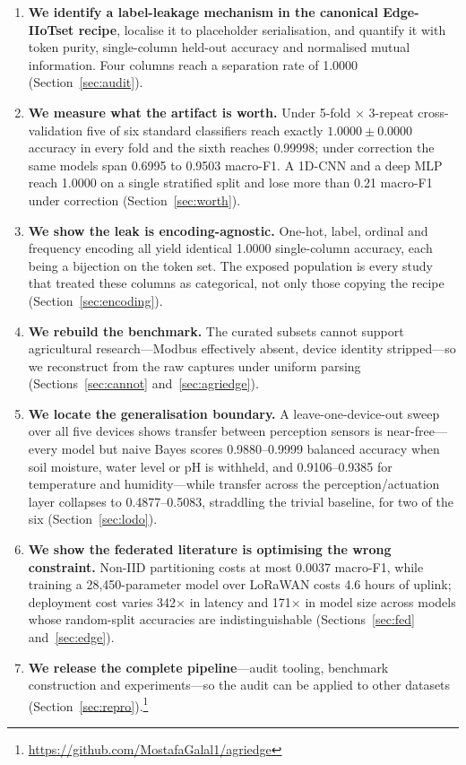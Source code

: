 \begin{enumerate}
\item \textbf{We identify a label-leakage mechanism in the canonical
Edge-IIoTset recipe}, localise it to placeholder serialisation, and quantify it
with token purity, single-column held-out accuracy and normalised mutual
information. Four columns reach a separation rate of 1.0000
(Section~\ref{sec:audit}).

\item \textbf{We measure what the artifact is worth.} Under 5-fold $\times$
3-repeat cross-validation five of six standard classifiers reach exactly
$1.0000 \pm 0.0000$ accuracy in every fold and the sixth reaches 0.99998; under
correction the same models span 0.6995 to 0.9503 macro-F1. A 1D-CNN and a deep
MLP reach 1.0000 on a single stratified split and lose more than 0.21 macro-F1
under correction (Section~\ref{sec:worth}).

\item \textbf{We show the leak is encoding-agnostic.} One-hot, label, ordinal
and frequency encoding all yield identical 1.0000 single-column accuracy, each
being a bijection on the token set. The exposed population is every study that
treated these columns as categorical, not only those copying the recipe
(Section~\ref{sec:encoding}).

\item \textbf{We rebuild the benchmark.} The curated subsets cannot support
agricultural research---Modbus effectively absent, device identity
stripped---so we reconstruct from the raw captures under uniform parsing
(Sections~\ref{sec:cannot} and~\ref{sec:agriedge}).

\item \textbf{We locate the generalisation boundary.} A leave-one-device-out
sweep over all five devices shows transfer between perception sensors is
near-free---every model but naive Bayes scores 0.9880--0.9999 balanced accuracy
when soil moisture, water level or pH is withheld, and 0.9106--0.9385 for
temperature and humidity---while transfer across the perception/actuation layer
collapses to 0.4877--0.5083, straddling the trivial baseline, for two of the
six (Section~\ref{sec:lodo}).

\item \textbf{We show the federated literature is optimising the wrong
constraint.} Non-IID partitioning costs at most 0.0037 macro-F1, while training
a 28{,}450-parameter model over LoRaWAN costs 4.6 hours of uplink; deployment
cost varies 342$\times$ in latency and 171$\times$ in model size across models
whose random-split accuracies are indistinguishable (Sections~\ref{sec:fed}
and~\ref{sec:edge}).

\item \textbf{We release the complete pipeline}---audit tooling, benchmark
construction and experiments---so the audit can be applied to other datasets
(Section~\ref{sec:repro}).\footnote{\url{https://github.com/MostafaGalal1/agriedge}}
\end{enumerate}

